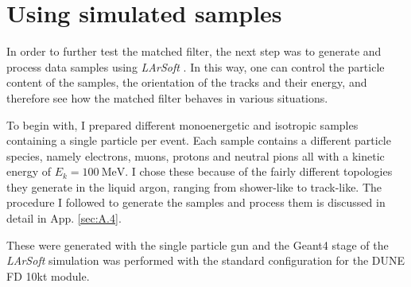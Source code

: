 \section{Using simulated samples}
\label{sec:2.5}

In order to further test the matched filter, the next step was to generate and process data samples using \textit{LArSoft} \cite{Church2013}. In this way, one can control the particle content of the samples, the orientation of the tracks and their energy, and therefore see how the matched filter behaves in various situations.

To begin with, I prepared different monoenergetic and isotropic samples containing a single particle per event. Each sample contains a different particle species, namely electrons, muons, protons and neutral pions all with a kinetic energy of $E_{k} = 100 \ \mathrm{MeV}$. I chose these because of the fairly different topologies they generate in the liquid argon, ranging from shower-like to track-like. The procedure I followed to generate the samples and process them is discussed in detail in App. \ref{sec:A.4}.

These were generated with the single particle gun and the Geant4 stage of the \textit{LArSoft} simulation \cite{Church2013} was performed with the standard configuration for the DUNE FD 10kt module. 

